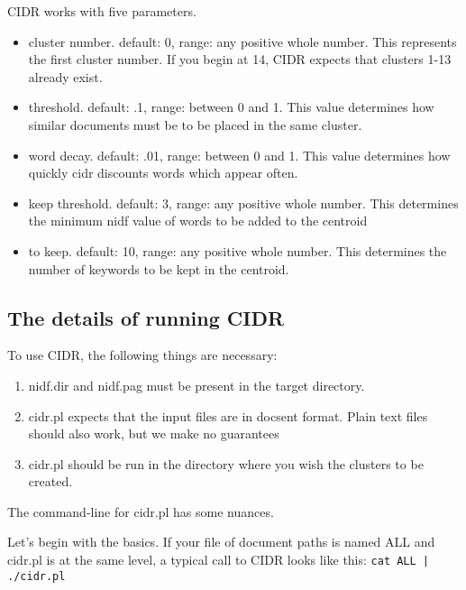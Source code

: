 \documentclass[10pt]{article}
\begin{document}
CIDR works with five parameters.
\begin{itemize}
\item cluster number.  default: 0, range: any positive whole number.  This 
represents the first cluster number.  If you begin at 14, CIDR expects 
that clusters 1-13 already exist.

\item threshold.  default: .1, range: between 0 and 1.  This value determines 
how similar documents must be to be placed in the same cluster.

\item word decay.  default: .01, range: between 0 and 1.  This value determines 
how quickly cidr discounts words which appear often.

\item keep threshold. default: 3, range: any positive whole number. This 
determines the minimum nidf value of words to be added to the centroid

\item to keep. default: 10, range: any positive whole number.  This determines 
the number of keywords to be kept in the centroid.
\end{itemize}

\subsection{The details of running CIDR}

To use CIDR, the following things are necessary:

\begin{enumerate}

\item nidf.dir and nidf.pag must be present in the target directory.

\item cidr.pl expects that the input files are in docsent format.  Plain text 
files should also work, but we make no guarantees

\item cidr.pl should be run in the directory where you wish the clusters to 
be created.
\end{enumerate}


The command-line for cidr.pl has some nuances.

Let's begin with the basics.  If your file of document paths is named ALL and cidr.pl is 
at the same level, a typical call to CIDR looks like this: {\tt cat ALL | ./cidr.pl}
\end{document}
